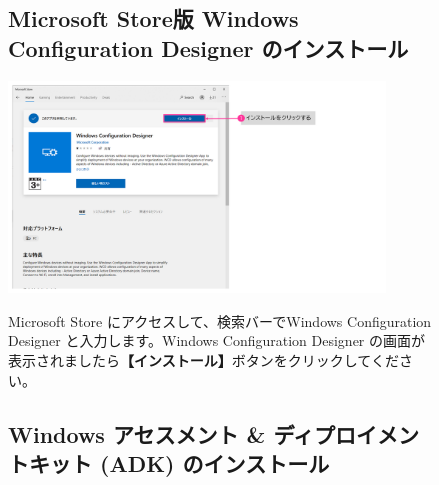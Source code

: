 \begin{figure}[htbp]
    \subsection{Microsoft Store版 Windows Configuration Designer のインストール}
\end{figure}

\begin{figure}[hp]
    \begin{minipage}{0.6\textwidth}
        \vspace{0cm}
        \includegraphics[width=10cm]{figures/Install_WinConfDisgn.png}
    \end{minipage}
    \begin{minipage}{0.4\textwidth}
        Microsoft Store にアクセスして、検索バーでWindows Configuration Designer と入力します。Windows Configuration Designer の画面が表示されましたら\textbf{【インストール】}ボタンをクリックしてください。
    \end{minipage}
    \vspace{3cm}
\end{figure}

\begin{figure}[htbp]
    \subsection{Windows アセスメント \& ディプロイメントキット (ADK) のインストール}
\end{figure}

